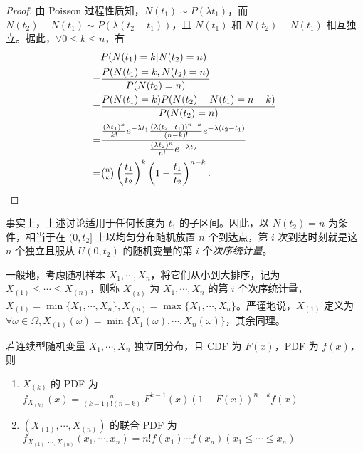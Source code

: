 \documentclass[../main.tex]{subfiles}
\begin{document}
\begin{proof}
    由 Poisson 过程性质知，$N(t_1)\sim P(\lambda t_1)$，而 $N(t_2)-N(t_1)\sim P(\lambda(t_2-t_1))$，且 $N(t_1)$ 和 $N(t_2)-N(t_1)$ 相互独立。据此，$\forall0\leq k\leq n$，有
    \begin{equation*}
        \begin{aligned}
              & P(N(t_1)=k|N(t_2)=n)                                                                                                                                      \\
            = & \frac{P(N(t_1)=k,N(t_2)=n)}{P(N(t_2)=n)}                                                                                                                  \\
            = & \frac{P(N(t_1)=k)P(N(t_2)-N(t_1)=n-k)}{P(N(t_2)=n)}                                                                                                       \\
            = & \frac{\frac{(\lambda t_1)^k}{k!}e^{-\lambda t_1}\frac{(\lambda(t_2-t_1))^{n-k}}{(n-k)!}e^{-\lambda(t_2-t_1)}}{\frac{(\lambda t_2)^n}{n!}e^{-\lambda t_2}} \\
            = & \tbinom nk\left(\frac{t_1}{t_2}\right)^k\left(1-\frac{t_1}{t_2}\right)^{n-k}.                                                                             \\
        \end{aligned}
    \end{equation*}
\end{proof}

事实上，上述讨论适用于任何长度为 $t_1$ 的子区间。因此，以 $N(t_2)=n$ 为条件，相当于在 $(0,t_2]$ 上以均匀分布随机放置 $n$ 个到达点，第 $i$ 次到达时刻就是这 $n$ 个独立且服从 $U(0,t_2)$ 的随机变量的第 $i$ 个\emph{次序统计量}。

一般地，考虑随机样本 $X_1,\cdots,X_n$，将它们从小到大排序，记为 $X_{(1)}\leq\cdots\leq X_{(n)}$，则称 $X_{(i)}$ 为 $X_1,\cdots,X_n$ 的第 $i$ 个次序统计量，$X_{(1)}=\min\{X_1,\cdots,X_n\},X_{(n)}=\max\{X_1,\cdots,X_n\}$。严谨地说，$X_{(1)}$ 定义为 $\forall\omega\in\Omega,X_{(1)}(\omega)=\min\{X_1(\omega),\cdots,X_n(\omega)\}$，其余同理。

\begin{proposition}\label{order_statistic}
    若连续型随机变量 $X_1,\cdots,X_n$ 独立同分布，且 CDF 为 $F(x)$，PDF 为 $f(x)$，则
    \begin{enumerate}
        \item $X_{(k)}$ 的 PDF 为 $f_{X_{(k)}}(x)=\frac{n!}{(k-1)!(n-k)!}F^{k-1}(x)(1-F(x))^{n-k}f(x)$
        \item $(X_{(1)},\cdots,X_{(n)})$ 的联合 PDF 为 $f_{X_{(1)},\cdots,X_{(n)}}(x_1,\cdots,x_n)=n!f(x_1)\cdots f(x_n)(x_1\leq\cdots\leq x_n)$
    \end{enumerate}
\end{proposition}
\end{document}
